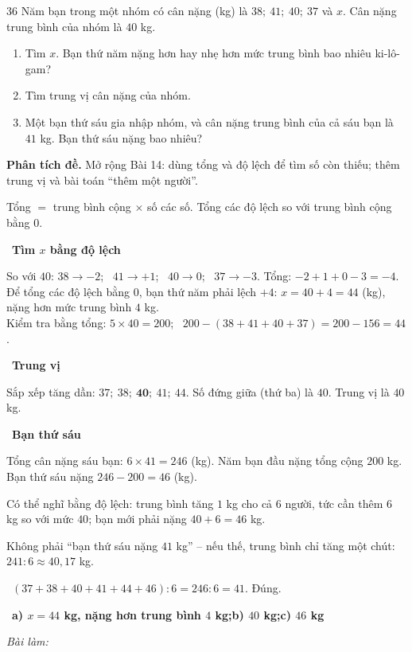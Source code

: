 \documentclass[11pt]{article}
\newif\ifsol \solfalse
\providecommand{\AnsWord}{Đáp số}
\newenvironment{probbox}[2]{\begin{probboxT}{#1}{#2}}{\end{probboxT}}
\newcommand{\StuProb}[2]{\begin{probboxS}{#1}{#2}\StuProbBody\end{probboxS}}
\newcommand{\ans}[1]{\par\smallskip{\bfseries\color{tmGreen!88!black}\AnsWord:}\ {\bfseries\color{AnsRed}#1}\par}
\newcommand{\probsol}[1]{%
  \begin{lrbox}{\solmeasure}\begin{minipage}{\dimexpr\linewidth-24pt\relax}#1\end{minipage}\end{lrbox}%
  \ifsol
    \begin{solbox}#1\end{solbox}%
  \else
    \setlength{\solht}{\dimexpr\ht\solmeasure+\dp\solmeasure+0.85cm\relax}%
    \ifdim\solht<1.35cm\setlength{\solht}{1.35cm}\fi
    \ifdim\solht>\StudentMaxWork\setlength{\solht}{\StudentMaxWork}\fi
    \par\noindent\begin{minipage}{\linewidth}%
    \expandafter\StuProb\StuProbArgs
    \begin{tcolorbox}[colback=white,colframe=Line,boxrule=0.8pt,arc=5pt,
      left=8pt,right=8pt,top=4pt,bottom=4pt,height=\solht]{\footnotesize\color{Slate}\itshape\WorkWord}\end{tcolorbox}%
    \end{minipage}\par\medskip
  \fi}
\newlength{\StudentMaxWork}\setlength{\StudentMaxWork}{4.5cm}
\newcommand{\step}[2]{\par\smallskip\noindent{\bfseries\color{tmBlue!85!black}\StepWord~#1.}\ {\bfseries #2}\par\nopagebreak}
\newcommand{\verify}[1]{\par\smallskip\noindent{\bfseries\color{tmGreen!80!black}\faCheckCircle\ \CheckWord}\ #1\par}
\def\WorkWord{Bài làm:}
\def\AnsWord{Đáp số}
\def\StepWord{Bước}
\def\CheckWord{Thử lại:}
\begin{document}

\begin{probbox}{36}{\relax}
Năm bạn trong một nhóm có cân nặng (kg) là $38;\ 41;\ 40;\ 37$ và $x$. Cân nặng trung bình của nhóm là $40$ kg.
\begin{enumerate}[label=\alph*),leftmargin=1.6em,itemsep=0pt,topsep=2pt]
  \item Tìm $x$. Bạn thứ năm nặng hơn hay nhẹ hơn mức trung bình bao nhiêu ki-lô-gam?
  \item Tìm trung vị cân nặng của nhóm.
  \item Một bạn thứ sáu gia nhập nhóm, và cân nặng trung bình của cả sáu bạn là $41$ kg. Bạn thứ sáu nặng bao nhiêu?
\end{enumerate}
\end{probbox}
\probsol{
\textbf{Phân tích đề.} Mở rộng Bài 14: dùng tổng và độ lệch để tìm số còn thiếu; thêm trung vị và bài toán ``thêm một người''.
\begin{recallbox}Tổng $=$ trung bình cộng $\times$ số các số. Tổng các độ lệch so với trung bình cộng bằng $0$.\end{recallbox}
\step{1}{Tìm $x$ bằng độ lệch}
So với $40$: $38 \to -2$; \ $41 \to +1$; \ $40 \to 0$; \ $37 \to -3$. Tổng: $-2 + 1 + 0 - 3 = -4$.\\
Để tổng các độ lệch bằng $0$, bạn thứ năm phải lệch $+4$: $x = 40 + 4 = 44$ (kg), nặng hơn mức trung bình $4$ kg.\\
Kiểm tra bằng tổng: $5\times 40 = 200$; \ $200 - (38 + 41 + 40 + 37) = 200 - 156 = 44$.
\step{2}{Trung vị}
Sắp xếp tăng dần: $37;\ 38;\ \mathbf{40};\ 41;\ 44$. Số đứng giữa (thứ ba) là $40$. Trung vị là $40$ kg.
\step{3}{Bạn thứ sáu}
Tổng cân nặng sáu bạn: $6\times 41 = 246$ (kg). Năm bạn đầu nặng tổng cộng $200$ kg. Bạn thứ sáu nặng $246 - 200 = 46$ (kg).
\begin{tipbox}Có thể nghĩ bằng độ lệch: trung bình tăng $1$ kg cho cả $6$ người, tức cần thêm $6$ kg so với mức $40$;
bạn mới phải nặng $40 + 6 = 46$ kg.\end{tipbox}
\begin{warnbox}Không phải ``bạn thứ sáu nặng $41$ kg'' -- nếu thế, trung bình chỉ tăng một chút: $241 : 6 \approx 40{,}17$ kg.\end{warnbox}
\verify{$(37 + 38 + 40 + 41 + 44 + 46) : 6 = 246 : 6 = 41$. Đúng.}
\ans{a) $x = 44$ kg, nặng hơn trung bình $4$ kg;\quad b) $40$ kg;\quad c) $46$ kg}
}

\end{document}
